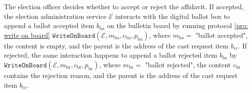 The election officer decides whether to accept or reject the affidavit. If accepted, the election administration service $\mathcal{E}$ interacts with the digital ballot box to append a ballot accepted item $b_\mathrm{ba}$ on the bulletin board by running protocol \ref{pro: write on board} $\mathtt{WriteOnBoard}(\mathcal{E}, m_\mathrm{ba}, c_\mathrm{ba}, p_\mathrm{ba})$, where $m_\mathrm{ba} = $ "ballot accepted", the content is empty, and the parent is the address of the cast request item $b_\mathrm{cr}$. If rejected, the same interaction happens to append a ballot rejected item $b_\mathrm{br}$ by $\mathtt{WriteOnBoard}(\mathcal{E}, m_\mathrm{br}, c_\mathrm{br}, p_\mathrm{br})$, where $m_\mathrm{br} = $ "ballot rejected", the content $c_\mathrm{br}$ contains the rejection reason, and the parent is the address of the cast request item $b_\mathrm{cr}$.

